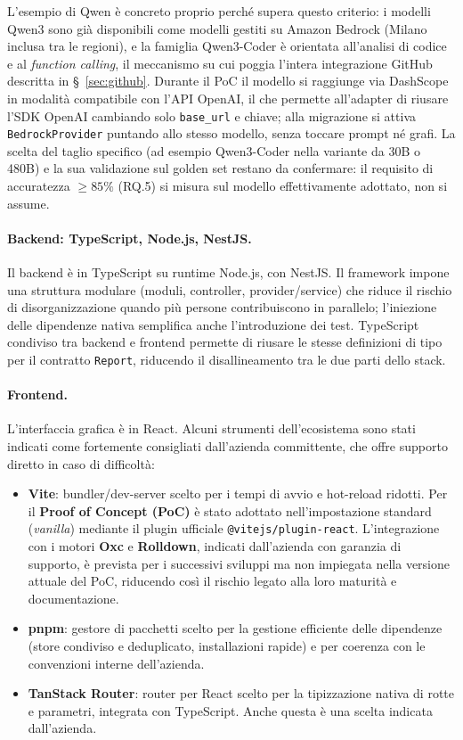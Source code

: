 \documentclass[11pt,a4paper]{article}
\begin{document}
L'esempio di Qwen è concreto proprio perché supera questo criterio: i modelli Qwen3 sono già disponibili come modelli gestiti su Amazon Bedrock (Milano inclusa tra le regioni), e la famiglia Qwen3-Coder è orientata all'analisi di codice e al \emph{function calling}, il meccanismo su cui poggia l'intera integrazione GitHub descritta in \S~\ref{sec:github}. Durante il PoC il modello si raggiunge via DashScope in modalità compatibile con l'API OpenAI, il che permette all'adapter di riusare l'SDK OpenAI cambiando solo \texttt{base\_url} e chiave; alla migrazione si attiva \texttt{BedrockProvider} puntando allo stesso modello, senza toccare prompt né grafi. La scelta del taglio specifico (ad esempio Qwen3-Coder nella variante da 30B o 480B) e la sua validazione sul golden set restano da confermare: il requisito di accuratezza $\geq 85\%$ (RQ.5) si misura sul modello effettivamente adottato, non si assume.

\paragraph{Backend: TypeScript, Node.js, NestJS.} Il backend è in TypeScript su runtime Node.js, con NestJS. Il framework impone una struttura modulare (moduli, controller, provider/service) che riduce il rischio di disorganizzazione quando più persone contribuiscono in parallelo; l'iniezione delle dipendenze nativa semplifica anche l'introduzione dei test. TypeScript condiviso tra backend e frontend permette di riusare le stesse definizioni di tipo per il contratto \texttt{Report}, riducendo il disallineamento tra le due parti dello stack.

\paragraph{Frontend.} L'interfaccia grafica è in React. Alcuni strumenti dell'ecosistema sono stati indicati come fortemente consigliati dall'azienda committente, che offre supporto diretto in caso di difficoltà:
\begin{itemize}
  \item \textbf{Vite}: bundler/dev-server scelto per i tempi di avvio e hot-reload ridotti. Per il \textbf{Proof of Concept (PoC)} è stato adottato nell'impostazione standard (\textit{vanilla}) mediante il plugin ufficiale \texttt{@vitejs/plugin-react}. L'integrazione con i motori \textbf{Oxc} e \textbf{Rolldown}, indicati dall'azienda con garanzia di supporto, è prevista per i successivi sviluppi ma non impiegata nella versione attuale del PoC, riducendo così il rischio legato alla loro maturità e documentazione.
  \item \textbf{pnpm}: gestore di pacchetti scelto per la gestione efficiente delle dipendenze (store condiviso e deduplicato, installazioni rapide) e per coerenza con le convenzioni interne dell'azienda.
  \item \textbf{TanStack Router}: router per React scelto per la tipizzazione nativa di rotte e parametri, integrata con TypeScript. Anche questa è una scelta indicata dall'azienda.
\end{itemize}
\end{document}
